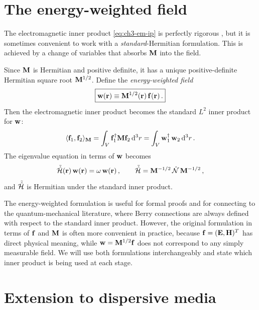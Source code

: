 \section{The energy-weighted field}
\label{sec:ch3-energy-weighted}

The electromagnetic inner product \eqref{eq:ch3-em-ip} is perfectly
rigorous \cite{gangaraj2016berry,raghu2008analogs}, but it is sometimes convenient to work with a
\emph{standard}-Hermitian formulation.  This is achieved by a change of
variables that absorbs $\mathbf{M}$ into the field.

Since $\mathbf{M}$ is Hermitian and positive definite, it has a unique
positive-definite Hermitian square root $\mathbf{M}^{1/2}$.  Define the
\emph{energy-weighted field}
\begin{equation}\label{eq:ch3-w-def}
  \boxed{%
  \emfieldw(\rvec) \equiv \Mmat^{1/2}(\rvec)\,\emfield(\rvec)\,.}
\end{equation}
Then the electromagnetic inner product becomes the standard $L^2$ inner
product for $\mathbf{w}$:
\begin{equation}\label{eq:ch3-w-ip}
  \langle \mathbf{f}_1 , \mathbf{f}_2 \rangle_{\mathbf{M}}
  = \int_V\mathbf{f}_1^\dagger\mathbf{M}\mathbf{f}_2\,\mathrm{d}^3r
  = \int_V\mathbf{w}_1^\dagger\,\mathbf{w}_2\,\mathrm{d}^3r\,.
\end{equation}
The eigenvalue equation in terms of $\mathbf{w}$ becomes
\begin{equation}\label{eq:ch3-w-evp}
  \tilde{\hat{\mathcal{H}}}(\mathbf{r})\,\mathbf{w}(\mathbf{r})
  = \omega\,\mathbf{w}(\mathbf{r})\,,
  \qquad
  \tilde{\hat{\mathcal{H}}}
  = \mathbf{M}^{-1/2}\,\hat{\mathcal{N}}\,\mathbf{M}^{-1/2}\,,
\end{equation}
and $\tilde{\hat{\mathcal{H}}}$ is Hermitian under the standard inner product.

\begin{remark}
The energy-weighted formulation is useful for formal proofs and for
connecting to the quantum-mechanical literature, where Berry connections
are always defined with respect to the standard inner product.  However,
the original formulation in terms of $\mathbf{f}$ and $\mathbf{M}$ is often
more convenient in practice, because $\mathbf{f}=(\mathbf{E},\mathbf{H})^T$
has direct physical meaning, while $\mathbf{w}=\mathbf{M}^{1/2}\mathbf{f}$ does
not correspond to any simply measurable field.  We will use both
formulations interchangeably and state which inner product is being used
at each stage.
\end{remark}

\section{Extension to dispersive media}
\label{sec:ch3-dispersive}

